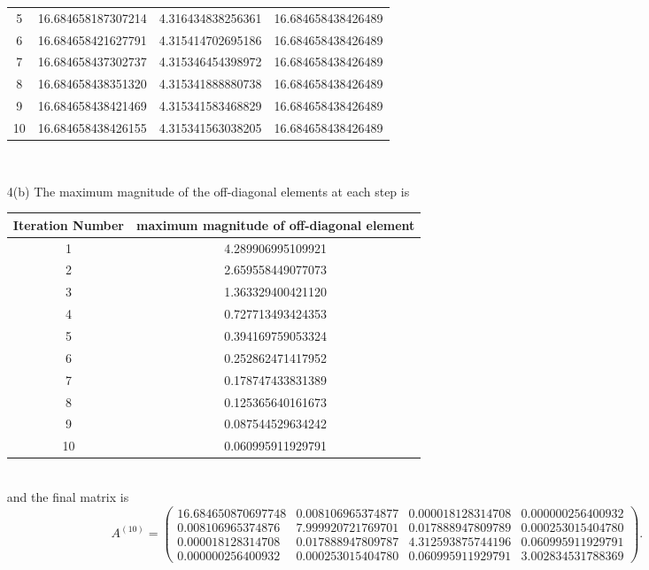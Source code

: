\documentclass[letterpaper]{article}
\begin{document}
\begin{enumerate}
\begin{tabular}{|c|c|c|c|}
       5 &  16.684658187307214 &  4.316434838256361 & 16.684658438426489\\
       6 &  16.684658421627791 &  4.315414702695186 & 16.684658438426489\\
       7 &  16.684658437302737 &  4.315346454398972 & 16.684658438426489\\
       8 &  16.684658438351320 &  4.315341888880738 & 16.684658438426489\\
       9 &  16.684658438421469 &  4.315341583468829 & 16.684658438426489\\
      10 &  16.684658438426155 &  4.315341563038205 & 16.684658438426489\\ \hline
    \end{tabular}\\

  \item[4(b)]\sol The maximum magnitude of the off-diagonal elements at each step is\\
  \begin{table}[!h]
    \centering
    \begin{tabular}{|c|c|}
    \hline
    Iteration Number & maximum magnitude of off-diagonal element\\ \hline
    1 & 4.289906995109921\\
    2 & 2.659558449077073\\
    3 & 1.363329400421120\\
    4 & 0.727713493424353\\
    5 & 0.394169759053324\\
    6 & 0.252862471417952\\
    7 & 0.178747433831389\\
    8 & 0.125365640161673\\
    9 & 0.087544529634242\\
   10 & 0.060995911929791\\ \hline
  \end{tabular}
  \end{table}\\[.2cm]
  and the final matrix is
  \begin{equation*}
    A^{(10)}=
    \begin{pmatrix}
    16.684650870697748 &  0.008106965374877 &  0.000018128314708 &  0.000000256400932\\
    0.008106965374876  & 7.999920721769701  & 0.017888947809789  & 0.000253015404780\\
    0.000018128314708  & 0.017888947809787  & 4.312593875744196  & 0.060995911929791\\
    0.000000256400932  & 0.000253015404780  & 0.060995911929791  & 3.002834531788369
    \end{pmatrix}.
  \end{equation*}\\

\end{enumerate}
\end{document}
